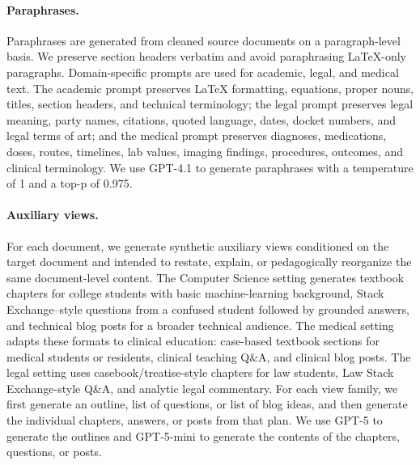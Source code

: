 \documentclass[11pt]{article}
\begin{document}
\paragraph{Paraphrases.}
Paraphrases are generated from cleaned source documents on a paragraph-level basis.  We preserve section headers verbatim and avoid paraphrasing LaTeX-only paragraphs. Domain-specific prompts are used for academic, legal, and medical text.  The academic prompt preserves LaTeX formatting, equations, proper nouns, titles, section headers, and technical terminology; the legal prompt preserves legal meaning, party names, citations, quoted language, dates, docket numbers, and legal terms of art; and the medical prompt preserves diagnoses, medications, doses, routes, timelines, lab values, imaging findings, procedures, outcomes, and clinical terminology. We use GPT-4.1 to generate paraphrases with a temperature of 1 and a top-p of 0.975.

\paragraph{Auxiliary views.}
For each document, we generate synthetic auxiliary views conditioned on the target document and intended to restate, explain, or pedagogically reorganize the same document-level content.  The Computer Science setting generates textbook chapters for college students with basic machine-learning background, Stack Exchange--style questions from a confused student followed by grounded answers, and technical blog posts for a broader technical audience.  The medical setting adapts these formats to clinical education: case-based textbook sections for medical students or residents, clinical teaching Q\&A, and clinical blog posts.  The legal setting uses casebook/treatise-style chapters for law students, Law Stack Exchange-style Q\&A, and analytic legal commentary.  For each view family, we first generate an outline, list of questions, or list of blog ideas, and then generate the individual chapters, answers, or posts from that plan. We use GPT-5 to generate the outlines and GPT-5-mini to generate the contents of the chapters, questions, or posts.
\end{document}
